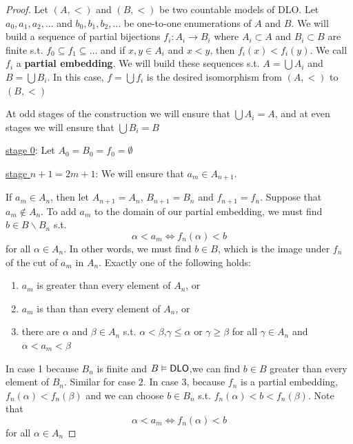 \documentclass[11pt]{article}
\begin{document}
\begin{proof}
Let \((A,<)\) and \((B,<)\) be two countable models of DLO. Let
\(a_0,a_1,a_2,\dots\) and \(b_0,b_1,b_2,\dots\) be one-to-one enumerations
of \(A\) and \(B\). We will build a sequence of partial bijections
\(f_i:A_i\to B_i\) where \(A_i\subset A\) and \(B_i\subset B\) are finite
s.t. \(f_0\subseteq f_1\subseteq\dots\) and if \(x,y\in A_i\) and \(x<y\),
then \(f_i(x)<f_i(y)\). We call \(f_i\) a \textbf{partial embedding}. We will build
these sequences s.t. \(A=\bigcup A_i\) and \(B=\bigcup B_i\). In this case,
\(f=\bigcup f_i\) is the desired isomorphism from \((A,<)\) to \((B,<)\)

At odd stages of the construction we will ensure that \(\bigcup A_i=A\), and
at even stages we will ensure that \(\bigcup B_i=B\)

\uline{stage 0}: Let \(A_0=B_0=f_0=\emptyset\)

\uline{stage \(n+1=2m+1\)}: We will ensure that \(a_m\in A_{n+1}\).

If \(a_m\in A_n\), then let \(A_{n+1}=A_n\), \(B_{n+1}=B_n\) and
\(f_{n+1}=f_n\). Suppose that \(a_m\not\in A_n\). To add \(a_m\) to the
domain of our partial embedding, we must find \(b\in B\backslash B_n\) s.t.
\begin{equation*}
\alpha<a_m\Leftrightarrow f_n(\alpha)<b
\end{equation*}
for all \(\alpha\in A_n\). In other words, we must find \(b\in B\), which is
the image under \(f_n\) of the cut of \(a_m\) in \(A_n\). Exactly one of the
following holds:
\begin{enumerate}
\item \(a_m\) is greater than every element of \(A_n\), or
\item \(a_m\) is than than every element of \(A_n\), or
\item there are \(\alpha\) and \(\beta\in A_n\) s.t. \(\alpha<\beta\),\(\gamma\le\alpha\) or
\(\gamma\ge\beta\) for all \(\gamma\in A_n\) and \(\alpha<a_m<\beta\)
\end{enumerate}


In case 1 because \(B_n\) is finite and \(B\vDash\operatorname{\textsf{DLO}}\),we can find 
\(b\in B\) greater than every element of \(B_n\). Similar for case 2. In
case 3, because \(f_n\) is a partial embedding, \(f_n(\alpha)<f_n(\beta)\) and we can
choose \(b\in B_n\) s.t. \(f_n(\alpha)<b<f_n(\beta)\). Note that 
\begin{equation*}
\alpha<a_m\Leftrightarrow f_n(\alpha)<b
\end{equation*}
for all \(\alpha\in A_n\)


\end{proof}
\end{document}
